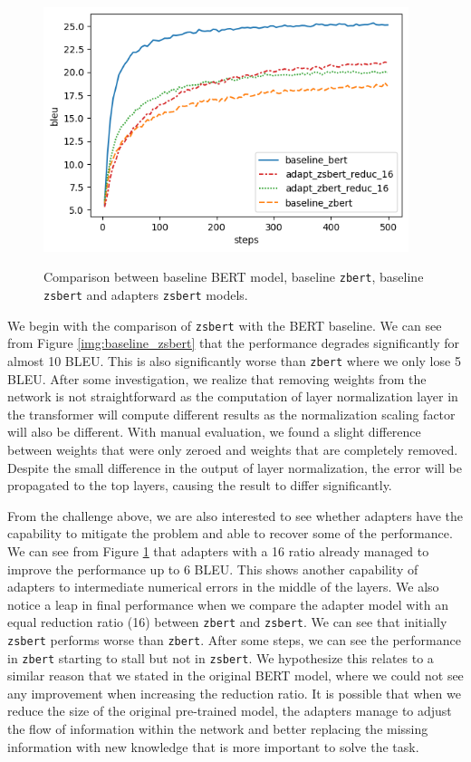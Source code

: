 \begin{figure}[]
    {\includegraphics[width=0.95\textwidth]{img/adapter_zsbert.png}}
    \centering
    \caption{Comparison between baseline BERT model, baseline \texttt{zbert}, baseline \texttt{zsbert} and adapters \texttt{zsbert} models.}
    \label{img:adapter_zsbert}
\end{figure}

We begin with the comparison of \texttt{zsbert} with the BERT baseline. We can see from Figure \ref{img:baseline_zsbert} that the performance degrades significantly for almost 10 BLEU. This is also significantly worse than \texttt{zbert} where we only lose 5 BLEU. After some investigation, we realize that removing weights from the network is not straightforward as the computation of layer normalization layer in the transformer will compute different results as the normalization scaling factor will also be different. With manual evaluation, we found a slight difference between weights that were only zeroed and weights that are completely removed. Despite the small difference in the output of layer normalization, the error will be propagated to the top layers, causing the result to differ significantly.

From the challenge above, we are also interested to see whether adapters have the capability to mitigate the problem and able to recover some of the performance. We can see from Figure \ref{img:adapter_zsbert} that adapters with a 16 ratio already managed to improve the performance up to 6 BLEU. This shows another capability of adapters to intermediate numerical errors in the middle of the layers. We also notice a leap in final performance when we compare the adapter model with an equal reduction ratio (16) between \texttt{zbert} and \texttt{zsbert}. We can see that initially \texttt{zsbert} performs worse than \texttt{zbert}. After some steps, we can see the performance in \texttt{zbert} starting to stall but not in \texttt{zsbert}. We hypothesize this relates to a similar reason that we stated in the original BERT model, where we could not see any improvement when increasing the reduction ratio. It is possible that when we reduce the size of the original pre-trained model, the adapters manage to adjust the flow of information within the network and better replacing the missing information with new knowledge that is more important to solve the task.


